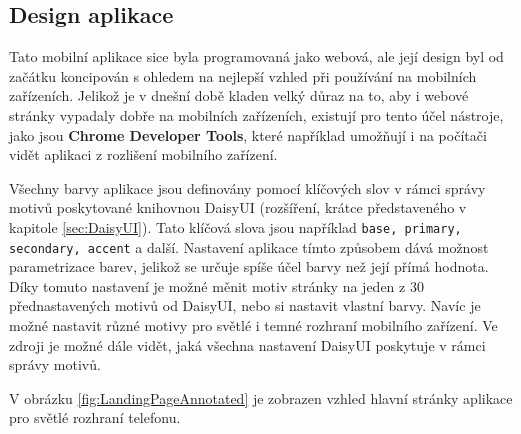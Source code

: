 \subsection{Design aplikace}\label{sec:DesignAplikace}

Tato mobilní aplikace sice byla programovaná jako webová, ale její design byl od začátku koncipován s ohledem na nejlepší vzhled při používání na mobilních zařízeních. Jelikož je v dnešní době kladen velký důraz na to, aby i webové stránky vypadaly dobře na mobilních zařízeních, existují pro tento účel nástroje, jako jsou \textbf{Chrome Developer Tools}, které například umožňují i na počítači vidět aplikaci z rozlišení mobilního zařízení.


Všechny barvy aplikace jsou definovány pomocí klíčových slov v rámci správy motivů poskytované knihovnou DaisyUI (rozšíření, krátce představeného v kapitole \ref{sec:DaisyUI}). Tato klíčová slova jsou například \texttt{base, primary, secondary, accent} a další. Nastavení aplikace tímto způsobem dává možnost parametrizace barev, jelikož se určuje spíše účel barvy než její přímá hodnota. Díky tomuto nastavení je možné měnit motiv stránky na jeden z 30 přednastavených motivů od DaisyUI, nebo si nastavit vlastní barvy. Navíc je možné nastavit různé motivy pro světlé i temné rozhraní mobilního zařízení. Ve zdroji \cite{DaisyUIthemeGenerator} je možné dále vidět, jaká všechna nastavení DaisyUI poskytuje v rámci správy motivů.

V obrázku \ref{fig:LandingPageAnnotated} je zobrazen vzhled hlavní stránky aplikace pro světlé rozhraní telefonu.

